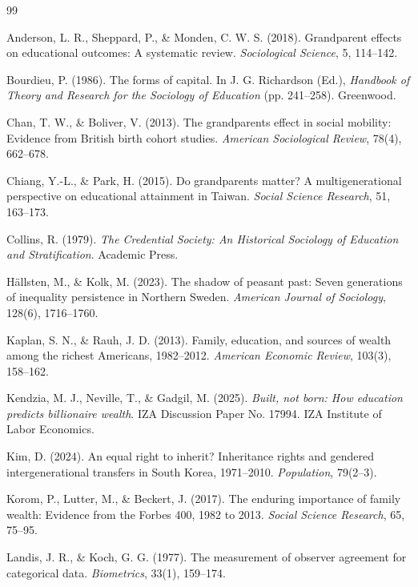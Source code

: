 \documentclass[UTF8,a4paper,11pt]{ctexart}
\begin{document}
\begin{thebibliography}{99}
\setlength{\itemsep}{2pt}

 Anderson, L. R., Sheppard, P., \& Monden, C. W. S. (2018). Grandparent effects on educational outcomes: A systematic review. \emph{Sociological Science}, 5, 114--142.

 Bourdieu, P. (1986). The forms of capital. In J. G. Richardson (Ed.), \emph{Handbook of Theory and Research for the Sociology of Education} (pp. 241--258). Greenwood.

 Chan, T. W., \& Boliver, V. (2013). The grandparents effect in social mobility: Evidence from British birth cohort studies. \emph{American Sociological Review}, 78(4), 662--678.

 Chiang, Y.-L., \& Park, H. (2015). Do grandparents matter? A multigenerational perspective on educational attainment in Taiwan. \emph{Social Science Research}, 51, 163--173.

 Collins, R. (1979). \emph{The Credential Society: An Historical Sociology of Education and Stratification}. Academic Press.

 Hällsten, M., \& Kolk, M. (2023). The shadow of peasant past: Seven generations of inequality persistence in Northern Sweden. \emph{American Journal of Sociology}, 128(6), 1716--1760.

 Kaplan, S. N., \& Rauh, J. D. (2013). Family, education, and sources of wealth among the richest Americans, 1982--2012. \emph{American Economic Review}, 103(3), 158--162.

 Kendzia, M. J., Neville, T., \& Gadgil, M. (2025). \emph{Built, not born: How education predicts billionaire wealth}. IZA Discussion Paper No. 17994. IZA Institute of Labor Economics.

 Kim, D. (2024). An equal right to inherit? Inheritance rights and gendered intergenerational transfers in South Korea, 1971--2010. \emph{Population}, 79(2--3).

 Korom, P., Lutter, M., \& Beckert, J. (2017). The enduring importance of family wealth: Evidence from the Forbes 400, 1982 to 2013. \emph{Social Science Research}, 65, 75--95.

 Landis, J. R., \& Koch, G. G. (1977). The measurement of observer agreement for categorical data. \emph{Biometrics}, 33(1), 159--174.


\end{thebibliography}
\end{document}
